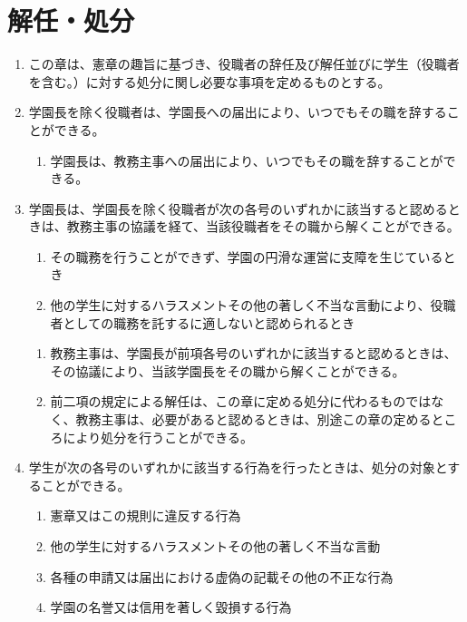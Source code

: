 \newpage
\chapter{解任・処分}
\begin{enumerate}[label=第\arabic*条　]
  \item この章は、憲章の趣旨に基づき、役職者の辞任及び解任並びに学生（役職者を含む。）に対する処分に関し必要な事項を定めるものとする。
  \item 学園長を除く役職者は、学園長への届出により、いつでもその職を辞することができる。
    \begin{enumerate}[label=\arabic*　,start=2,leftmargin=*]
      \item 学園長は、教務主事への届出により、いつでもその職を辞することができる。
    \end{enumerate}
  \item 学園長は、学園長を除く役職者が次の各号のいずれかに該当すると認めるときは、教務主事の協議を経て、当該役職者をその職から解くことができる。
      \begin{enumerate}[label=(\arabic*)　]
        \item その職務を行うことができず、学園の円滑な運営に支障を生じているとき
        \item 他の学生に対するハラスメントその他の著しく不当な言動により、役職者としての職務を託するに適しないと認められるとき
      \end{enumerate}
    \begin{enumerate}[label=\arabic*　,start=2,leftmargin=*]
      \item 教務主事は、学園長が前項各号のいずれかに該当すると認めるときは、その協議により、当該学園長をその職から解くことができる。
      \item 前二項の規定による解任は、この章に定める処分に代わるものではなく、教務主事は、必要があると認めるときは、別途この章の定めるところにより処分を行うことができる。
    \end{enumerate}
  \item 学生が次の各号のいずれかに該当する行為を行ったときは、処分の対象とすることができる。
      \begin{enumerate}[label=(\arabic*)　]
        \item 憲章又はこの規則に違反する行為
        \item 他の学生に対するハラスメントその他の著しく不当な言動
        \item 各種の申請又は届出における虚偽の記載その他の不正な行為
        \item 学園の名誉又は信用を著しく毀損する行為

\end{enumerate}
\end{enumerate}
